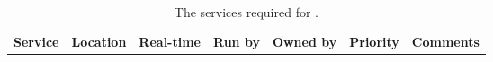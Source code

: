 \begin{table} \centering
{}
\vspace{-0.25in}
\begin{tabular}{p{\mycolwidth} p{\mycolwidth} l l l l p{\mycolwidth}}
{\bf \tiny Service}  & {\bf \tiny Location} & \bf {\tiny Real-time} & {\bf \tiny Run by} & \bf {\tiny Owned by} & {\bf \tiny Priority} & {\bf \tiny Comments} \\

\end{tabular}
\caption{The \einfra services required for \ED. \label{tab:services}}
\end{table}
